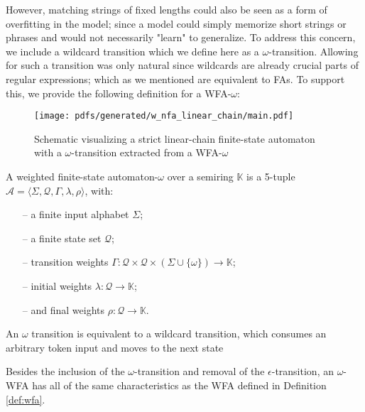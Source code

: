 However, matching strings of fixed lengths could also be seen as a form of
overfitting in the model; since a model could simply memorize short strings or
phrases and would not necessarily "learn" to generalize. To address this
concern, we include a wildcard transition which we define here as a
$\omega$-transition. Allowing for such a transition was only natural since
wildcards are already crucial parts of regular expressions; which as we
mentioned are equivalent to FAs. To support this, we provide the following
definition for a WFA-$\omega$:

\begin{figure}[t]
  \centering
  \texttt{[image: pdfs/generated/w\_nfa\_linear\_chain/main.pdf]}
  \caption{Schematic visualizing a strict linear-chain finite-state automaton with
    a $\omega$-transition extracted from a WFA-$\omega$}
  \label{fig:fsa-w}
\end{figure}

\begin{definition}
  \label{def:w-wsa}
  A weighted finite-state automaton-$\omega$ over a semiring $\mathbb{K}$ is a
  5-tuple $\mathcal{A} = \langle \Sigma, \mathcal{Q}, \Gamma, \lambda, \rho
  \rangle$, with:

  \begin{itemize}
  \itemsep0em
    \item[--] a finite input alphabet $\Sigma$;
    \item[--] a finite state set $\mathcal{Q}$;
    \item[--] transition weights $\Gamma: \mathcal{Q} \times \mathcal{Q} \times (\Sigma \cup \{\omega\}) \rightarrow \mathbb{K}$;
    \item[--] initial weights $\lambda: \mathcal{Q} \rightarrow \mathbb{K}$;
    \item[--] and final weights $\rho: \mathcal{Q} \rightarrow \mathbb{K}$.
  \end{itemize}

  \begin{remark}
    An $\omega$ transition is equivalent to a wildcard transition, which
    consumes an arbitrary token input and moves to the next state
  \end{remark}

  \begin{remark}
    Besides the inclusion of the $\omega$-transition and removal of the
    $\epsilon$-transition, an $\omega$-WFA has all of the same characteristics
    as the WFA defined in Definition \ref{def:wfa}.
  \end{remark}
\end{definition}

